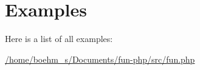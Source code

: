 \section{Examples}
Here is a list of all examples\+:\begin{DoxyCompactItemize}
\item 
\hyperlink{_2home_2boehm_s_2Documents_2fun-php_2src_2fun_8php-example}{/home/boehm\+\_\+s/\+Documents/fun-\/php/src/fun.\+php}
\end{DoxyCompactItemize}
